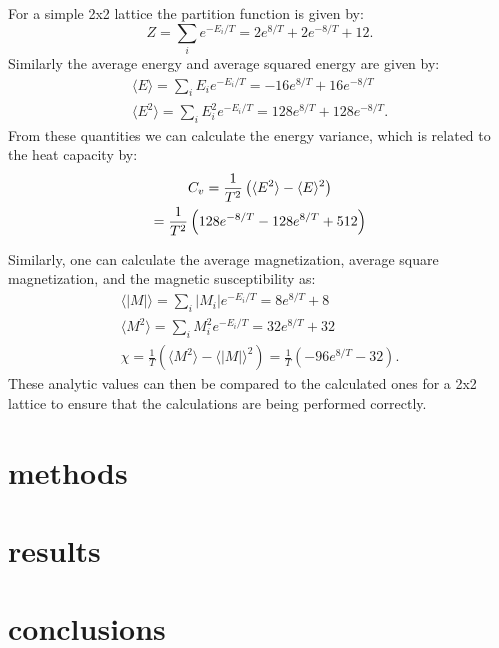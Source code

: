 \documentclass[prc,amsmath,twocolumn,superscriptaddress]{revtex4}
\begin{document}
For a simple 2x2 lattice the partition function is given by:
\begin{equation}
Z=\sum_i e^{-E_i/T} = 2e^{8/T}+2e^{-8/T}+12.
\end{equation}
Similarly the average energy and average squared energy are given by:
\begin{gather}
\langle E\rangle= \sum_i E_i e^{-E_i/T} = -16e^{8/T}+16e^{-8/T}\\
\langle E^2\rangle= \sum_i E^2_i e^{-E_i/T} = 128e^{8/T}+128e^{-8/T}.
\end{gather}
From these quantities we can calculate the energy variance, which is related to the heat capacity by:
\begin{gather}
C_v = \frac{1}{T^2} \left(\langle E^2\rangle-\langle E\rangle^2\right) \notag \\
= \frac{1}{T^2} \left(128e^{-8/T}-128e^{8/T}+512\right)
\end{gather}

Similarly, one can calculate the average magnetization, average square magnetization, and the magnetic susceptibility as:
\begin{gather}
\langle |M|\rangle= \sum_i |M_i| e^{-E_i/T} = 8e^{8/T}+8\\
\langle M^2\rangle= \sum_i M^2_i e^{-E_i/T} = 32e^{8/T}+32 \\
\chi = \frac{1}{T} \left(\langle M^2\rangle-\langle |M|\rangle^2\right)= \frac{1}{T} \left(-96e^{8/T}-32\right).
\end{gather}
These analytic values can then be compared to the calculated ones for a 2x2 lattice to ensure that the calculations are being performed correctly.

\section{methods}
\label{methods}



\section{results}
\label{results}


\section{conclusions}
\label{conc}
\end{document}
